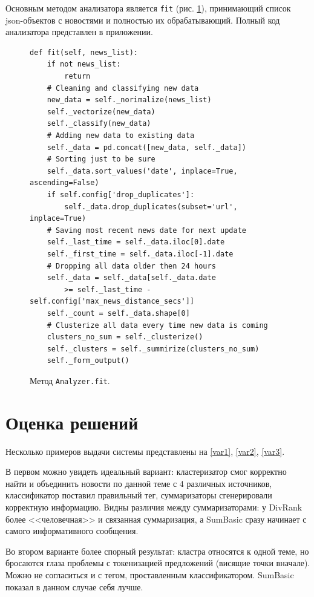 \documentclass[a4paper, 14pt]{extarticle}
\begin{document}
Основным методом анализатора является \texttt{fit} (рис. \ref{fit}), принимающий список json-объектов с новостями и полностью их обрабатывающий. Полный код анализатора представлен в приложении.



\begin{figure}
	\centering
	\begin{verbatim}
def fit(self, news_list):
    if not news_list:
        return
    # Cleaning and classifying new data
    new_data = self._norimalize(news_list)
    self._vectorize(new_data)
    self._classify(new_data)
    # Adding new data to existing data
    self._data = pd.concat([new_data, self._data])
    # Sorting just to be sure
    self._data.sort_values('date', inplace=True, ascending=False)
    if self.config['drop_duplicates']:
        self._data.drop_duplicates(subset='url', inplace=True)
    # Saving most recent news date for next update
    self._last_time = self._data.iloc[0].date
    self._first_time = self._data.iloc[-1].date
    # Dropping all data older then 24 hours
    self._data = self._data[self._data.date
        >= self._last_time - self.config['max_news_distance_secs']]
    self._count = self._data.shape[0]
    # Clusterize all data every time new data is coming
    clusters_no_sum = self._clusterize()
    self._clusters = self._summirize(clusters_no_sum)
    self._form_output()
	\end{verbatim}
	\caption{Метод \texttt{Analyzer.fit}.}
	\label{fit}
\end{figure}


\section{Оценка решений}
Несколько примеров выдачи системы представлены на \ref{var1}, \ref{var2}, \ref{var3}.

В первом можно увидеть идеальный вариант: кластеризатор смог корректно найти и объединить новости по данной теме с 4 различных источников, классификатор поставил правильный тег, суммаризаторы сгенерировали корректную информацию. Видны различия между суммаризаторами: у DivRank более <<человечная>> и связанная суммаризация, а SumBasic сразу начинает с самого информативного сообщения.

Во втором варианте более спорный результат: кластра относятся к одной теме, но бросаются глаза проблемы с токенизацией предложений (висящие точки вначале). Можно не согласиться и с тегом, проставленным классификатором. SumBasic показал в данном случае себя лучше.
\end{document}
